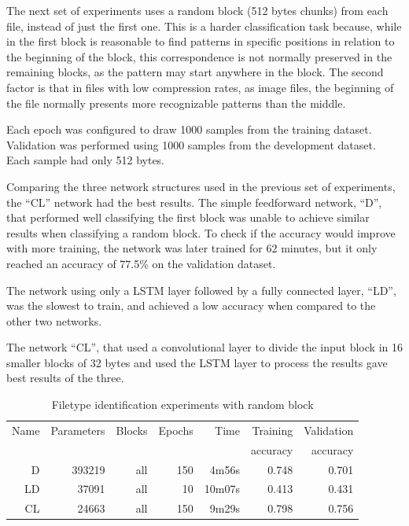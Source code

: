 The next set of experiments uses a random block (512 bytes chunks) from each file, instead of just the first one. This is a harder classification task because, while in the first block is reasonable to find patterns in specific positions in relation to the beginning of the block, this correspondence is not normally preserved in the remaining blocks, as the pattern may start anywhere in the block. The second factor is that in files with low compression rates, as image files, the beginning of the file normally presents more recognizable patterns than the middle.

Each epoch was configured to draw 1000 samples from the training dataset. Validation was performed using 1000 samples from the development dataset. Each sample had only 512 bytes.

Comparing the three network structures used in the previous set of experiments, the ``CL'' network had the best results.
The simple feedforward network, ``D'', that performed well classifying the first block was unable to achieve similar results when classifying a random block.
To check if the accuracy would improve with more training, the network was later trained for 62 minutes, but it only reached an accuracy of 77.5\% on the validation dataset.

The network using only a LSTM layer followed by a fully connected layer, ``LD'', was the slowest to train, and achieved a low accuracy when compared to the other two networks.

The network ``CL'', that used a convolutional layer to divide the input block in 16 smaller blocks of 32 bytes and used the LSTM layer to process the results gave best results of the three.

\begin{table}[!ht]
    \centering
    \caption{Filetype identification experiments with random block}
    \label{tab:carvingrandomblock}
\begin{tabular}{r|r|r|r|r|r|r}
\hline
Name & Parameters & Blocks & Epochs & Time    & Training          & Validation          \\       
     &            &        &        &         &          accuracy &            accuracy \\ \hline\hline

D	    & 393219	& all	& 150	& 4m56s	    & 0.748	& 0.701 \\\hline
LD	    & 37091 	& all	& 10	& 10m07s	& 0.413	& 0.431 \\\hline
CL	    & 24663	    & all	& 150	& 9m29s	    & 0.798	& 0.756 \\\hline
\end{tabular}
\end{table}

